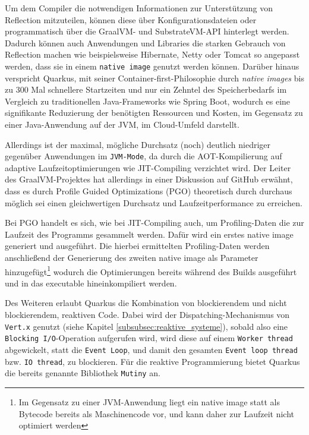 Um dem Compiler die notwendigen Informationen zur Unterstützung von Reflection mitzuteilen, können
diese über Konfigurationsdateien oder programmatisch über die GraalVM- und SubstrateVM-API hinterlegt werden.
Dadurch können auch Anwendungen und Libraries die starken Gebrauch von Reflection machen wie beispielsweise Hibernate, Netty oder Tomcat
so angepasst werden, dass sie in einem \verb|native image| genutzt werden können.
\parencite{GraalVMNativeImage}
Darüber hinaus verspricht Quarkus, mit seiner Container-first-Philosophie durch \textit{native images} bis zu 300 Mal schnellere Startzeiten
und nur ein Zehntel des Speicherbedarfs im Vergleich zu traditionellen Java-Frameworks wie Spring Boot, wodurch es eine signifikante Reduzierung
der benötigten Ressourcen und Kosten, im Gegensatz zu einer Java-Anwendung auf der JVM, im Cloud-Umfeld darstellt.
\parencite{RedHatQuarkusInfografik}

Allerdings ist der maximal, mögliche Durchsatz (noch) deutlich niedriger gegenüber Anwendungen im \verb|JVM-Mode|, da durch die AOT-Kompilierung
auf adaptive Laufzeitoptimierungen wie JIT-Compiling verzichtet wird.
Der Leiter des GraalVM-Projektes hat allerdings in einer Diskussion auf GitHub erwähnt, dass es durch Profile Guided Optimizations (PGO)
theoretisch durch durchaus möglich sei einen gleichwertigen Durchsatz und Laufzeitperformance zu erreichen\parencite{GraalWuerthinger}.

Bei PGO handelt es sich, wie bei JIT-Compiling auch, um Profiling-Daten die zur Laufzeit des Programms gesammelt werden.
Dafür wird ein erstes native image generiert und ausgeführt. Die hierbei ermittelten Profiling-Daten werden anschließend der
Generierung des zweiten native image als Parameter hinzugefügt\footnote{Im Gegensatz zu einer JVM-Anwendung liegt ein
    native image statt als Bytecode bereits als Maschinencode vor, und kann daher zur Laufzeit nicht optimiert werden}
wodurch die Optimierungen bereits während des Builds ausgeführt und in das executable hineinkompiliert werden.

Des Weiteren erlaubt Quarkus die Kombination von blockierendem und nicht blockierendem, reaktiven Code.
Dabei wird der Dispatching-Mechanismus von \verb|Vert.x| genutzt (siehe Kapitel \ref{subsubsec:reaktive_systeme}), sobald also eine
\verb|Blocking I/O|-Operation aufgerufen wird, wird diese auf einem \verb|Worker thread| abgewickelt, statt die \verb|Event Loop|, und damit den
gesamten \verb|Event loop thread| bzw. \verb|IO thread|, zu blockieren.
Für die reaktive Programmierung bietet Quarkus die bereits genannte Bibliothek \verb|Mutiny| an.\parencite{Quarkus}

